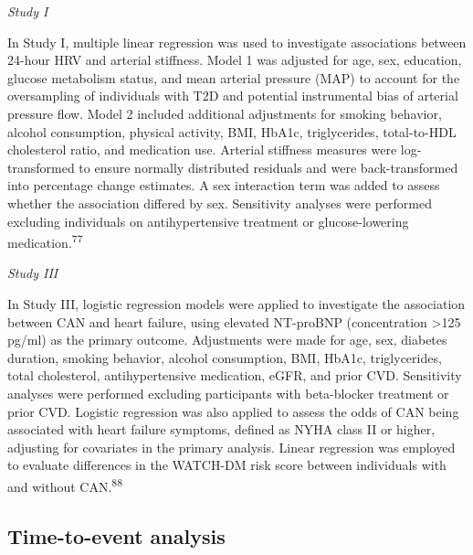 \documentclass[
  a4paper,
  headsepline=true,
  open=left]{scrbook}
\begin{document}
\emph{Study I}

In Study I, multiple linear regression was used to investigate
associations between 24-hour HRV and arterial stiffness. Model 1 was
adjusted for age, sex, education, glucose metabolism status, and mean
arterial pressure (MAP) to account for the oversampling of individuals
with T2D and potential instrumental bias of arterial pressure flow.
Model 2 included additional adjustments for smoking behavior, alcohol
consumption, physical activity, BMI, HbA1c, triglycerides, total-to-HDL
cholesterol ratio, and medication use. Arterial stiffness measures were
log-transformed to ensure normally distributed residuals and were
back-transformed into percentage change estimates. A sex interaction
term was added to assess whether the association differed by sex.
Sensitivity analyses were performed excluding individuals on
antihypertensive treatment or glucose-lowering
medication.\textsuperscript{77}

\emph{Study III}

In Study III, logistic regression models were applied to investigate the
association between CAN and heart failure, using elevated NT-proBNP
(concentration \textgreater125 pg/ml) as the primary outcome.
Adjustments were made for age, sex, diabetes duration, smoking behavior,
alcohol consumption, BMI, HbA1c, triglycerides, total cholesterol,
antihypertensive medication, eGFR, and prior CVD. Sensitivity analyses
were performed excluding participants with beta-blocker treatment or
prior CVD. Logistic regression was also applied to assess the odds of
CAN being associated with heart failure symptoms, defined as NYHA class
II or higher, adjusting for covariates in the primary analysis. Linear
regression was employed to evaluate differences in the WATCH-DM risk
score between individuals with and without CAN.\textsuperscript{88}

\hypertarget{time-to-event-analysis}{%
\subsection{Time-to-event analysis}\label{time-to-event-analysis}}
\end{document}
